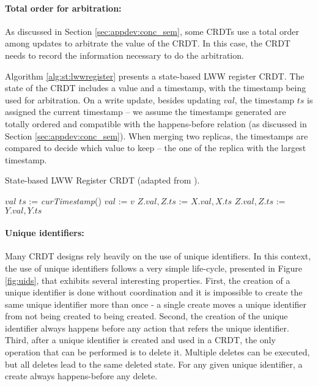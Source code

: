 \documentclass[12pt]{article}
\begin{document}
\paragraph{Total order for arbitration:}
As discussed in Section \ref{sec:appdev:conc_sem}, some CRDTs use a
total order among updates to arbitrate the value of the CRDT.
In this case, the CRDT needs to record the information necessary to do
the arbitration.

Algorithm \ref{alg:st:lwwregister} presents a state-based LWW register CRDT. 
The state of the CRDT includes a value and a timestamp, with the
timestamp being used for arbitration.
On a write update, besides updating $val$, the timestamp $ts$ is
assigned the current timestamp -- we assume the timestamps generated are 
totally ordered and compatible with the happens-before relation (as discussed in Section \ref{sec:appdev:conc_sem}).
When merging two replicas, the timestamps are compared to decide
which value to keep -- the one of the replica with the largest timestamp.


\begin{algorithm}
\caption{State-based LWW Register CRDT (adapted from \cite{Shapiro11Comprehensive}).}
\label{alg:st:lwwregister}
\begin{algorithmic}[1]
 
\EndPayload
{}
\State \Return $\mathit{val}$
\EndQuery
{}
    \State $\mathit{ts}$ := \emph{curTimestamp}() 
    \State $\mathit{val}$ := $v$
\EndUpdate
{}
    \State $Z.\mathit{val}, Z.\mathit{ts}$ := $X.\mathit{val}, X.\mathit{ts}$
    \Else
    \State $Z.\mathit{val}, Z.\mathit{ts}$ := $Y.\mathit{val}, Y.\mathit{ts}$
    \EndIf
\EndMerge
\end{algorithmic}
\end{algorithm}

\paragraph{Unique identifiers:}
Many CRDT designs rely heavily on the use of unique identifiers.
In this context, the use of unique identifiers follows a very simple life-cycle, 
presented in Figure \ref{fig:uids}, that exhibits several interesting properties.
First, the creation of a unique identifier is done without coordination and
it is impossible to create the same unique identifier more than once -
a single create moves a unique identifier from not being created to being created.
Second, the creation of the unique identifier always happens before any action 
that refers the unique identifier. 
Third, after a unique identifier is created and used in a CRDT, the only operation 
that can be performed is to delete it. Multiple deletes can be executed, but all
deletes lead to the same deleted state.
For any given unique identifier, a create always happens-before any delete.
\end{document}

